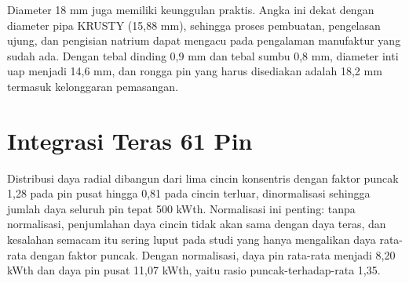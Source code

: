 \documentclass[
  indonesian,
  12pt,
  a4paper,
]{report}
\begin{document}
Diameter 18 mm juga memiliki keunggulan praktis. Angka ini dekat dengan
diameter pipa KRUSTY (15,88 mm), sehingga proses pembuatan, pengelasan
ujung, dan pengisian natrium dapat mengacu pada pengalaman manufaktur
yang sudah ada. Dengan tebal dinding 0,9 mm dan tebal sumbu 0,8 mm,
diameter inti uap menjadi 14,6 mm, dan rongga pin yang harus disediakan
adalah 18,2 mm termasuk kelonggaran pemasangan.

\section{Integrasi Teras 61 Pin}\label{integrasi-teras-61-pin}

Distribusi daya radial dibangun dari lima cincin konsentris dengan
faktor puncak 1,28 pada pin pusat hingga 0,81 pada cincin terluar,
dinormalisasi sehingga jumlah daya seluruh pin tepat 500 kWth.
Normalisasi ini penting: tanpa normalisasi, penjumlahan daya cincin
tidak akan sama dengan daya teras, dan kesalahan semacam itu sering
luput pada studi yang hanya mengalikan daya rata-rata dengan faktor
puncak. Dengan normalisasi, daya pin rata-rata menjadi 8,20 kWth dan
daya pin pusat 11,07 kWth, yaitu rasio puncak-terhadap-rata 1,35.
\end{document}
